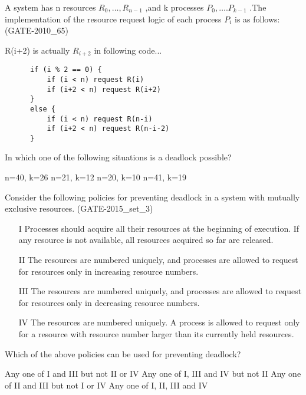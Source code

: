 \begin{questyle}

  \question  A system has n resources {\large \( { R_0,…,R_{n-1}  } \) },and k processes {\large \( { P_0,….P_{k-1} } \) } .The implementation of the resource request logic of each process \(P_i\) is as follows:  (GATE-2010\_65)

  R(i+2) is actually \( R_{i+2} \) in following code...
  \begin{lstlisting}
      if (i % 2 == 0) {
          if (i < n) request R(i)
          if (i+2 < n) request R(i+2)
      }
      else {
          if (i < n) request R(n-i)
          if (i+2 < n) request R(n-i-2)
      }
  \end{lstlisting}

  In which one of the following situations is a deadlock possible?

  \begin{oneparchoices}
    \choice n=40, k=26
    \correctchoice n=21, k=12
    \choice n=20, k=10
    \choice n=41, k=19
  \end{oneparchoices}

  \end{questyle}




\begin{questyle}

  \question  Consider the following policies for preventing deadlock in a system with mutually exclusive resources. (GATE-2015\_set\_3)

  \begin{enumerate}
      \item[I]  Processes should acquire all their resources at the beginning of execution.
                If any resource is not available, all resources acquired so far are released.
      \item[II] The resources are numbered uniquely, and processes are allowed to request
                for resources only in increasing resource numbers.
      \item[III] The resources are numbered uniquely, and processes are allowed to request
                  for resources only in decreasing resource numbers.
      \item[IV]  The resources are numbered uniquely. A process is allowed to request only for a
                  resource with resource number larger than its currently held resources.
  \end{enumerate}
  Which of the above policies can be used for preventing deadlock?

  \begin{choices}
    \choice Any one of I and III but not II or IV
    \choice Any one of I, III and IV but not II
    \choice Any one of II and III but not I or IV
    \correctchoice Any one of I, II, III and IV
  \end{choices}

  \end{questyle}



